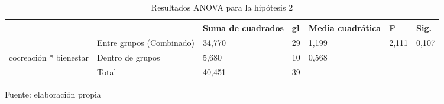 \begin{table}[h]
    \caption {Resultados ANOVA para la hipótesis 2}
	\label{tab:anovaH2}
	\setlength\extrarowheight{5pt}
	
	\begin{tabular}{p{2.1cm} p{4.1cm} p{1.8cm} p{0.9cm} p{1.8cm} p{0.9cm} p{1.0cm}}
	\toprule
			&						& Suma de cuadrados	& gl	& Media cuadrática	& F	& Sig. \\
	\midrule
			& Entre grupos (Combinado)		& 34,770	& 29	& 1,199	& 2,111	& 0,107 \\
	cocreación * bienestar	& Dentro de grupos	& 5,680	& 10	& 0,568	&	& \\
			& Total							& 40,451	& 39 \\
	\bottomrule
	\end{tabular}
	
	\center
	\footnotesize
	Fuente: elaboración propia
\end{table}

